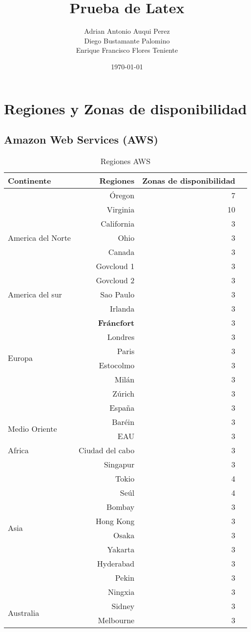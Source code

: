 \documentclass{article}
\title{Prueba de Latex}
\date{\today}
\author{
    Adrian Antonio Auqui Perez \\
    Diego Bustamante Palomino \\
    Enrique Francisco Flores Teniente
  }
\affil{UTEC}
\begin{document}
\maketitle

\section{Regiones y Zonas de disponibilidad}

\subsection{Amazon Web Services (AWS)}

\begin{table}[!htp]\centering
\caption{Regiones AWS}\label{tab: }
\scriptsize
\begin{tabular}{lrrr}\toprule
Continente &Regiones &Zonas de disponibilidad \\\midrule
\multirow{7}{*}{America del Norte} &Óregon &7 \\
&Virginia &10 \\
&California &3 \\
&Ohio &3 \\
&Canada &3 \\
&Govcloud 1 &3 \\
&Govcloud 2 &3 \\
America del sur &Sao Paulo &3 \\
\multirow{8}{*}{Europa} &Irlanda &3 \\
&\textbf{Fráncfort} &3 \\
&Londres &3 \\
&Paris &3 \\
&Estocolmo &3 \\
&Milán &3 \\
&Zúrich &3 \\
&España &3 \\
\multirow{2}{*}{Medio Oriente} &Baréin &3 \\
&EAU &3 \\
Africa &Ciudad del cabo &3 \\
\multirow{10}{*}{Asia} &Singapur &3 \\
&Tokio &4 \\
&Seúl &4 \\
&Bombay &3 \\
&Hong Kong &3 \\
&Osaka &3 \\
&Yakarta &3 \\
&Hyderabad &3 \\
&Pekin &3 \\
&Ningxia &3 \\
\multirow{2}{*}{Australia} &Sidney &3 \\
&Melbourne &3 \\
\bottomrule
\end{tabular}
\end{table}
\end{document}
